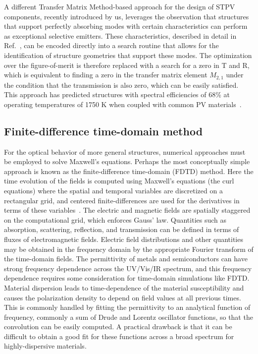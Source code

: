 \documentclass[10pt,letterpaper]{article}
\begin{document}
{A different Transfer Matrix Method-based approach for the design of STPV components, recently introduced by us, 
leverages the observation that structures that support perfectly absorbing modes with 
certain characteristics can perform as exceptional selective emitters.  These characteristics, described in detail in
Ref.~\cite{FUS_OptExp_2015}, can be
encoded directly into a search routine that allows for the identification of structure geometries that support these modes.  The
optimization over the figure-of-merit is therefore replaced with a search for a zero in T and R, which is equivalent to finding
a zero in the transfer matrix element $M_{2,1}$ under the condition that the transmission is also zero, which can be easily satisfied.
This approach has predicted structures with spectral efficiencies of 68\% at operating temperatures of 1750 K when coupled
with common PV materials~\cite{FUS_OptExp_2015}.

\subsection{Finite-difference time-domain method}

For the optical behavior of more general structures, numerical approaches must be employed to solve Maxwell's equations.  Perhaps the
most conceptually simple approach is known as the finite-difference time-domain (FDTD) method.  Here the time evolution of the fields
is computed using Maxwell's equations (the curl equations) where the spatial and temporal variables are discretized on a rectangular
grid, and centered finite-differences are used for the derivatives in terms of these variables~\cite{Taflove_FDTD}.
The electric and magnetic fields are spatially
staggered on the computational grid, which enforces Gauss' law.  Quantities such as absorption, scattering, reflection, and transmission
can be defined in terms of fluxes of electromagnetic fields.  Electric field distributions and other quantities may be obtained in the
frequency domain by the appropriate Fourier transform of the time-domain fields.  The permittivity of metals and semiconductors can
have strong frequency dependence across the UV/Vis/IR spectrum, and this frequency dependence requires some consideration for time-domain
simulations like FDTD.  
Material dispersion leads to time-dependence of the material susceptibility and 
causes the polarization
density to depend on field values at all previous times.  
This is commonly handled by fitting the permittivity to an analytical
function of frequency, commonly a sum of Drude and Lorentz oscillator functions, so that the convolution can be easily computed.  A
practical drawback is that it can be difficult to obtain a good fit for these functions across a broad spectrum for highly-dispersive materials.

}
\end{document}
